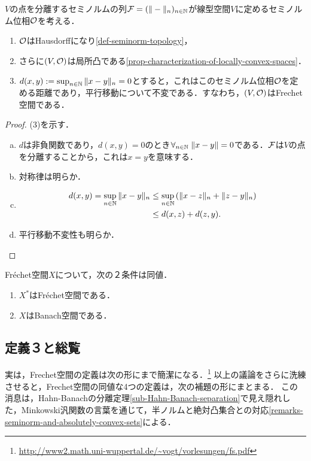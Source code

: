 \documentclass[uplatex,dvipdfmx]{jsreport}
\begin{document}
\begin{definition}[ゲージ空間としての捉え方]
    $V$の点を分離するセミノルムの列$\mathcal{F}=(\|-\|_n)_{n\in\mathbb{N}}$が線型空間$V$に定めるセミノルム位相$\mathcal{O}$を考える．
    \begin{enumerate}
        \item $\mathcal{O}$はHausdorffになり\ref{def-seminorm-topology}，
        \item さらに$(V,\mathcal{O})$は局所凸である\ref{prop-characterization-of-locally-convex-spaces}．
        \item $d(x,y):=\sup_{n\in\mathbb{N}}\|x-y\|_n=0$とすると，これはこのセミノルム位相$\mathcal{O}$を定める距離であり，平行移動について不変である．すなわち，$(V,\mathcal{O})$はFrechet空間である．
    \end{enumerate}
\end{definition}
\begin{proof}
    (3)を示す．
    \begin{enumerate}[(a)]
        \item $d$は非負関数であり，$d(x,y)=0$のとき$\forall_{n\in\mathbb{N}}\;\|x-y\|=0$である．$\mathcal{F}$は$V$の点を分離することから，これは$x=y$を意味する．
        \item 対称律は明らか．
        \item \begin{align*}
            d(x,y)=\sup_{n\in\mathbb{N}}\|x-y\|_n&\le\sup_{n\in\mathbb{N}}\left(\|x-z\|_n+\|z-y\|_n\right)\\
            &\le d(x,z)+d(z,y).
        \end{align*}
        \item 平行移動不変性も明らか．
    \end{enumerate}
\end{proof}

\begin{proposition}[Banach空間との関係]
    Fréchet空間$X$について，次の２条件は同値．
    \begin{enumerate}
        \item $X^*$はFréchet空間である．
        \item $X$はBanach空間である．
    \end{enumerate}
\end{proposition}

\subsection{定義３と総覧}

\begin{tcolorbox}[colframe=ForestGreen, colback=ForestGreen!10!white,breakable,colbacktitle=ForestGreen!40!white,coltitle=black,fonttitle=\bfseries\sffamily,
title=]
    実は，Frechet空間の定義は次の形にまで簡潔になる．\footnote{\url{http://www2.math.uni-wuppertal.de/~vogt/vorlesungen/fs.pdf}}
    以上の議論をさらに洗練させると，Frechet空間の同値な4つの定義は，次の補題の形にまとまる．
    この消息は，Hahn-Banachの分離定理\ref{sub-Hahn-Banach-separation}で見え隠れした，Minkowski汎関数の言葉を通じて，半ノルムと絶対凸集合との対応\ref{remarks-seminorm-and-absolutely-convex-sets}による．
\end{tcolorbox}
\end{document}

